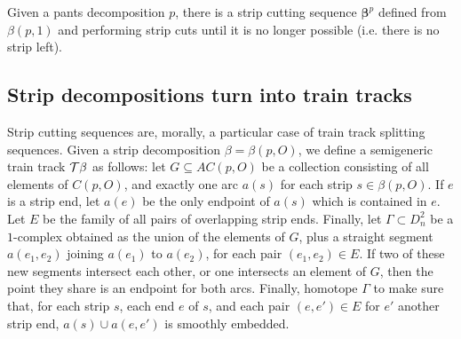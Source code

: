


Given a pants decomposition $p$, there is a  strip cutting sequence $\bm\beta^p$ defined from $\beta(p,1)$ and performing strip cuts until it is no longer possible (i.e. there is no strip left).

\subsection{Strip decompositions turn into train tracks}

Strip cutting sequences are, morally, a particular case of train track splitting sequences. Given a strip decomposition $\beta=\beta(p,O)$, we define a semigeneric train track ${\mathcal T}\beta$ as follows: let $G\subseteq AC(p,O)$ be a collection consisting of all elements of $C(p,O)$, and exactly one arc $a(s)$ for each strip $s\in\beta(p,O)$. If $e$ is a strip end, let $a(e)$ be the only endpoint of $a(s)$ which is contained in $e$. Let $E$ be the family of all pairs of overlapping strip ends. Finally, let $\Gamma\subset D^2_n$ be a $1$-complex obtained as the union of the elements of $G$, plus a straight segment $a(e_1,e_2)$ joining $a(e_1)$ to $a(e_2)$, for each pair $(e_1,e_2)\in E$. If two of these new segments intersect each other, or one intersects an element of $G$, then the point they share is an endpoint for both arcs. Finally, homotope $\Gamma$ to make sure that, for each strip $s$, each end $e$ of $s$, and each pair $(e,e')\in E$ for $e'$ another strip end, $a(s)\cup a(e,e')$ is smoothly embedded.

